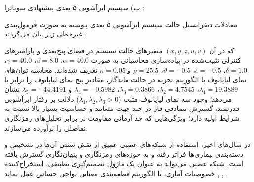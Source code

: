 

ب) سیستم ابرآشوبی ۵ بعدی پیشنهادی سوباترا :\par

معادلات دیفرانسیل حالت سیستم ابرآشوبی ۵ بعدی پیوسته به صورت فرمول‌بندی غیرخطی زیر بیان می‌گردند :\par






که در آن $(x,\allowbreak{} y,\allowbreak{} z,\allowbreak{} u,\allowbreak{} v)$ متغیرهای حالت سیستم در فضای پنج‌بعدی و پارامترهای کنترلی تثبیت‌شده در پیاده‌سازی محاسباتی به صورت $\alpha = 40.0$، $\beta = 8.0$، $\gamma = 40.0$، $\delta = 1.0$، $\epsilon = -0.5$، $\vartheta = -0.5$، $\rho = 25.5$ و $\kappa = 0.05$ تعریف شده‌اند. محاسبه توان‌های نمای لیاپانوف با الگوریتم تجزیه  در حالت ماندگار، مقادیر پنج نمای لیاپانوف را برابر با $\lambda_1 = 19.3889$، $\lambda_2 = 4.7545$، $\lambda_3 = 0.3866$، $\lambda_4 = -0.5982$ و $\lambda_5 = -44.4191$ نشان می‌دهد؛ وجود سه نمای لیاپانوف مثبت ($\lambda_1, \lambda_2, \lambda_3 > 0$) دلالت بر رفتار ابرآشوبی قدرتمند، گسترش تصادفی فاز در چند جهت متعامد و حساسیت بسیار بالا نسبت به شرایط اولیه دارد؛ ویژگی‌هایی که حد آرمانی مقاومت در برابر تحلیل‌های رمزنگاری تفاضلی را برآورده می‌سازند.\par




در سال‌های اخیر، استفاده از شبکه‌های عصبی عمیق  از نقش سنتی آن‌ها در تشخیص و دسته‌بندی بیماری‌ها فراتر رفته و به حوزه‌های رمزنگاری و پنهان‌نگاری گسترش یافته است. شبکه عصبی می‌تواند به عنوان یک ماژول تصمیم‌گیری تطبیقی، استخراج‌کننده خصوصیات آماری، یا الگوریتم قطعه‌بندی معنایی نواحی حساس  عمل نماید , , .\par

